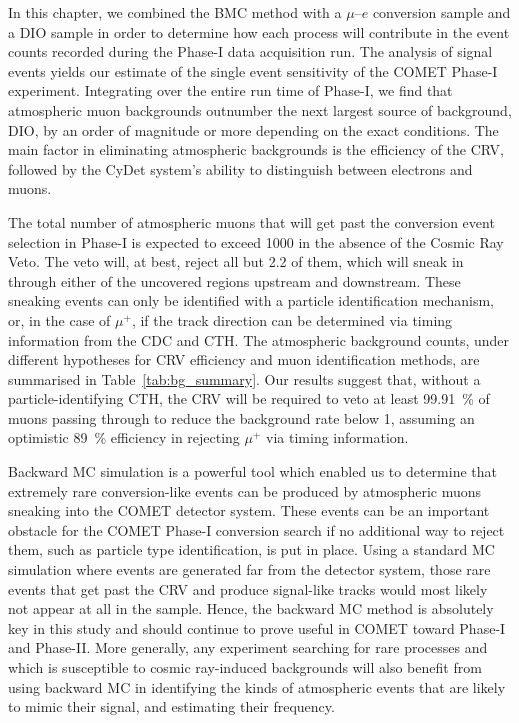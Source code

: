 In this chapter, we combined the BMC method with a $\mu$--$e$ conversion sample
and a DIO sample in order to determine how each process will contribute in the
event counts recorded during the Phase\nobreakdash-I data acquisition run. The
analysis of signal events yields our estimate of the single event sensitivity of
the COMET Phase\nobreakdash-I experiment. Integrating over the entire run time
of Phase\nobreakdash-I, we find that atmospheric muon backgrounds outnumber the
next largest source of background, DIO, by an order of magnitude or more
depending on the exact conditions. The main factor in eliminating atmospheric
backgrounds is the efficiency of the CRV, followed by the CyDet system's ability
to distinguish between electrons and muons. 


The total number of atmospheric muons that will get past the conversion event
selection in Phase\nobreakdash-I is expected to exceed 1000 in the absence of
the Cosmic Ray Veto. The veto will, at best, reject all but 2.2 of them, which
will sneak in through either of the uncovered regions upstream and downstream.
These sneaking events can only be identified with a particle identification
mechanism, or, in the case of $\mu^+$, if the track direction can be determined
via timing information from the CDC and CTH. The atmospheric background counts,
under different hypotheses for CRV efficiency and muon identification methods,
are summarised in Table~\ref{tab:bg_summary}. Our results suggest that, without
a particle-identifying CTH, the CRV will be required to veto at least
\SI{99.91}{\percent} of muons passing through to reduce the background rate
below 1, assuming an optimistic \SI{89}{\percent} efficiency in rejecting
$\mu^+$ via timing information.


Backward MC simulation is a powerful tool which enabled us to determine that
extremely rare conversion-like events can be produced by atmospheric muons
sneaking into the COMET detector system. These events can be an important
obstacle for the COMET Phase\nobreakdash-I conversion search if no additional
way to reject them, such as particle type identification, is put in place. Using
a standard MC simulation where events are generated far from the detector
system, those rare events that get past the CRV and produce signal-like tracks
would most likely not appear at all in the sample. Hence, the backward MC method
is absolutely key in this study and should continue to prove useful in COMET
toward Phase\nobreakdash-I and Phase\nobreakdash-II. More generally, any
experiment searching for rare processes and which is susceptible to cosmic
ray-induced backgrounds will also benefit from using backward MC in identifying
the kinds of atmospheric events that are likely to mimic their signal, and
estimating their frequency.

